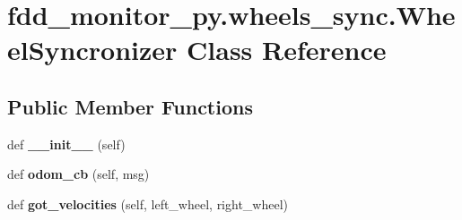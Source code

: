 \hypertarget{classfdd__monitor__py_1_1wheels__sync_1_1WheelSyncronizer}{}\section{fdd\+\_\+monitor\+\_\+py.\+wheels\+\_\+sync.\+Wheel\+Syncronizer Class Reference}
\label{classfdd__monitor__py_1_1wheels__sync_1_1WheelSyncronizer}
\subsection*{Public Member Functions}
\begin{DoxyCompactItemize}
\item 
\mbox{\label{classfdd__monitor__py_1_1wheels__sync_1_1WheelSyncronizer_a3a09a9e067b55db863d1a35a02dd495b}} 
def {\bfseries \+\_\+\+\_\+init\+\_\+\+\_\+} (self)
\item 
\mbox{\label{classfdd__monitor__py_1_1wheels__sync_1_1WheelSyncronizer_a383702e17592e870926301ef567481ee}} 
def {\bfseries odom\+\_\+cb} (self, msg)
\item 
\mbox{\label{classfdd__monitor__py_1_1wheels__sync_1_1WheelSyncronizer_a6506f85fce4bd2b87f57aa7e83ebead2}} 
def {\bfseries got\+\_\+velocities} (self, left\+\_\+wheel, right\+\_\+wheel)
\end{DoxyCompactItemize}
